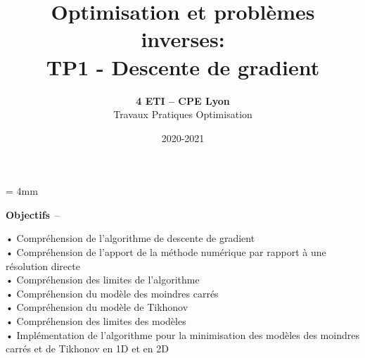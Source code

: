 \documentclass{article}
\begin{document}

\baselineskip = 4mm
\title{Optimisation et problèmes inverses: \\
TP1 - Descente de gradient}

\author{\textbf{4 ETI -- CPE Lyon }\\[3mm]
{Travaux Pratiques Optimisation}}
\date{2020-2021}

\maketitle

\noindent{}
\vspace*{5mm}



{\Large\bf Objectifs}~--~~\begin{minipage}[t]{135mm}
• Compréhension de l’algorithme de descente de gradient\\
• Compréhension de l’apport de la méthode numérique par rapport à une résolution directe\\
• Compréhension des limites de l’algorithme\\
• Compréhension du modèle des moindres carrés\\
• Compréhension du modèle de Tikhonov\\
• Compréhension des limites des modèles\\
• Implémentation de l’algorithme pour la minimisation des modèles des moindres carrés et de
Tikhonov en 1D et en 2D\\
\end{minipage}
\end{document}
